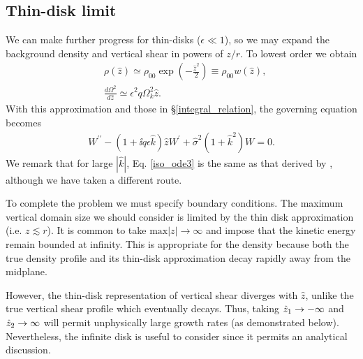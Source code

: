 \subsection{Thin-disk limit}
We can make further progress for thin-disks ($\epsilon\ll1$), 
so we may expand the background density and vertical shear in powers
of $z/r$. To lowest order we obtain 
\begin{align}
  &\rho(\hat{z}) \simeq \rho_{00}
  \exp{\left(-\frac{\hat{z}^2}{2}\right)} \equiv \rho_{00}w(\hat{z}),\label{thin_dens}\\
  &\frac{d\Omega^2}{d\hat{z}} \simeq \epsilon^2q\Omega_k^2\hat{z}. \label{thin_vshear}
\end{align}
With this approximation and those in \S\ref{integral_relation}, the
governing equation becomes 
\begin{align}\label{iso_ode3}
  W^{\prime\prime} - \left(1 + \ii q\epsilon
    \hat{k}\right)\hat{z}W^\prime  +
  \hat{\sigma}^2\left(1+\hat{k}^2\right)W = 
  0.
\end{align}
We remark that for large $|\hat{k}|$, Eq. \ref{iso_ode3} is the same as
that derived by \cite{nelson13}, although we have taken a different
route.  

To complete the problem we must specify boundary conditions. The
maximum vertical domain size we should consider is limited by the thin disk
approximation (i.e. $z\lesssim r$). It is common to take $\mathrm{max}|z|\to\infty$
and impose that the kinetic  energy remain bounded at infinity.  This
is appropriate for the density because both the true density profile
and its thin-disk approximation decay rapidly away from the midplane.   

However, the thin-disk representation of vertical shear diverges with 
$\hat{z}$, unlike the true vertical shear profile which eventually
decays.  Thus, taking $\hat{z}_1\to -\infty$ and $\hat{z}_2\to\infty$ will permit unphysically large growth
rates (as demonstrated below). Nevertheless, the infinite disk is
useful to consider since it permits an analytical discussion. 

